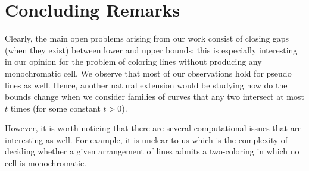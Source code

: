 \documentclass[11pt,a4paper]{article}
\newcommand{\sholong}[2]{#2}
\begin{document}
\section{Concluding Remarks}\label{sec:conclusion}
Clearly, the main open problems arising from our work consist of closing gaps (when they exist) between lower and upper bounds; this is especially interesting in our opinion for the
problem of coloring lines without producing any monochromatic cell. \sholong{}{We observe that most of our observations hold for pseudo lines as well. Hence, another natural extension would be studying how do the bounds change when we consider families of curves that any two intersect at most $t$ times (for some constant $t>0$).}

However, it is worth noticing that there are several computational issues that are interesting
as well. For example, it is unclear to us which is the complexity of deciding whether a given
arrangement of lines admits a two-coloring in which no cell is monochromatic.
\end{document}
